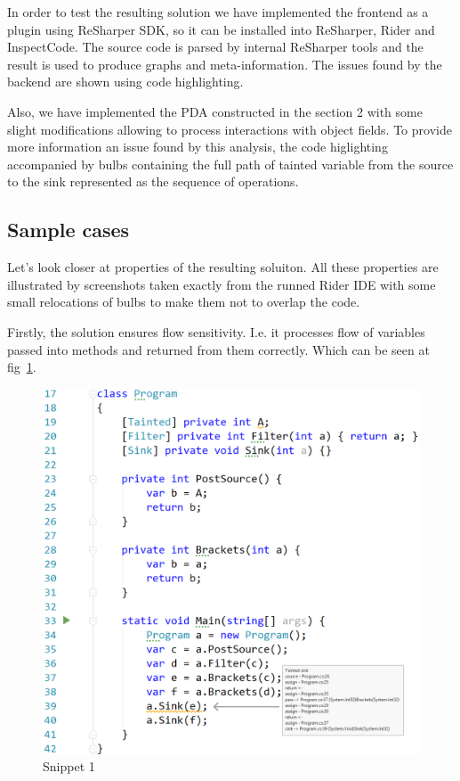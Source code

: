 In order to test the resulting solution we have implemented the frontend as a plugin using ReSharper SDK, so it can be installed into ReSharper, Rider and InspectCode.
The source code is parsed by internal ReSharper tools and the result is used to produce graphs and meta-information.
The issues found by the backend are shown using code highlighting.

Also, we have implemented the PDA constructed in the section 2 with some slight modifications allowing to process interactions with object fields.
To provide more information an issue found by this analysis, the code higlighting accompanied by bulbs containing the full path of tainted variable from the source to the sink represented as the sequence of operations.

\subsection{Sample cases}

Let's look closer at properties of the resulting soluiton.
All these properties are illustrated by screenshots taken exactly from the runned Rider IDE with some small relocations of bulbs to make them not to overlap the code.

Firstly, the solution ensures flow sensitivity. I.e. it processes flow of variables passed into methods and returned from them correctly.
Which can be seen at fig~\ref{fig:ReturnsAndBrackets}.

\begin{figure}[h]
	\includegraphics[width=\linewidth]{screenshots/ReturnsAndBrackets.png}
	\caption{Snippet 1}
	\label{fig:ReturnsAndBrackets}
\end{figure}


